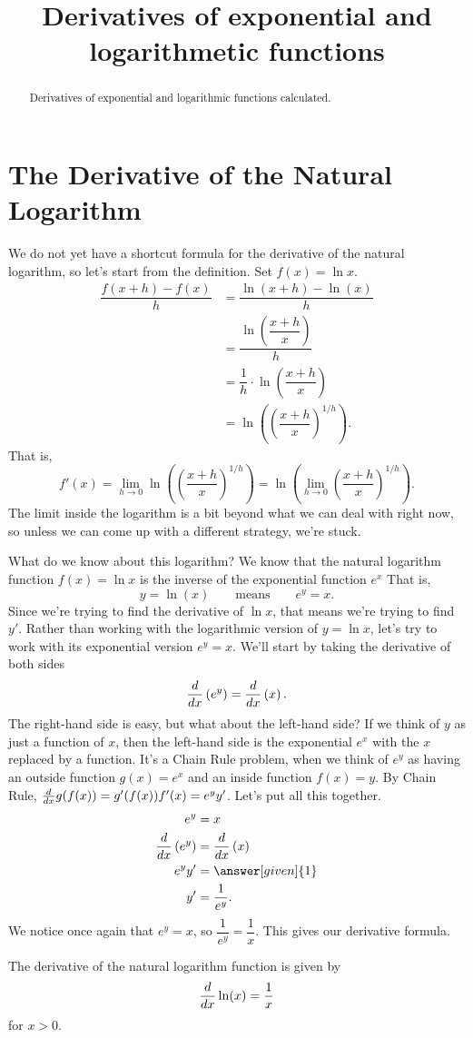 \documentclass{ximera}
\title[Dig-In:]{Derivatives of exponential and logarithmetic functions}
\begin{document}
\begin{abstract}
  Derivatives of exponential and logarithmic functions calculated.
\end{abstract}
\maketitle

\section{The Derivative of the Natural Logarithm}


We do not yet have a shortcut formula for the derivative of the natural logarithm, so let's start
from the definition.  Set $f(x) = \ln x$.
\begin{align*}
	\dfrac{f(x+h) - f(x)}{h} &= \dfrac{\ln(x+h) - \ln(x)}{h} \\
		&= \dfrac{ \ln \left( \dfrac{x+h}{x} \right) }{h} \\
		&= \dfrac{1}{h} \cdot \ln \left( \dfrac{x+h}{x} \right) \\
		&= \ln \left( \left( \dfrac{x+h}{x} \right)^{1/h} \right).
\end{align*}
That is, 
\[ f'(x) = \lim_{h \to 0} \ln \left( \left( \dfrac{x+h}{x} \right)^{1/h} \right) = \ln \left( \lim_{h \to 0} \left( \dfrac{x+h}{x} \right)^{1/h} \right).\]
The limit inside the logarithm is a bit beyond what we can deal with right now, so unless we can come up with a different strategy, we're stuck.


What do we know about this logarithm?  We know that the natural logarithm function $f(x) = \ln x$ is the inverse of the exponential function $e^x$
That is, 
  \[  y = \ln(x)\qquad\text{means}\qquad e^y = x. \]
Since we're trying to find the derivative of $\ln x$, that means we're trying to find $y'$.  Rather than working with the logarithmic version of $y = \ln x$,
let's try to work with its exponential version $e^y = x$.
We'll start by taking the derivative of both sides
\[ \frac{d}{\mathop{}\!d x} \left( e^y \right) = \frac{d}{\mathop{}\!d x} \left( x \right). \]
The right-hand side is easy, but what about the left-hand side?  If we think of $y$ as just a function of $x$, then the left-hand side is the exponential $e^x$ with the
$x$ replaced by a function.  It's a Chain Rule problem, when we think of $e^y$ as having an outside function $g(x) = e^x$ and an inside function $f(x) = y$.
By Chain Rule, $\frac{d}{\mathop{}\!d x} g(f(x)) = g'(f(x)) f'(x) = e^y y'$.  Let's put all this together.
\begin{align*}
		e^y &= x\\
	\ddx \left( e^y \right) &= \ddx \left( x \right)	\\
	e^y y' &= \answer[given]{1}\\
	y' &= \dfrac{1}{e^y}.
\end{align*}
We notice once again that $e^y = x$, so $\dfrac{1}{e^y} = \dfrac{1}{x}$.  This gives our derivative formula.
\begin{theorem}
	The derivative of the natural logarithm function is given by
	\[ \frac{d}{\mathop{}\!d x} \ln(x) = \dfrac{1}{x} \] for $x > 0$.
\end{theorem}
\end{document}
